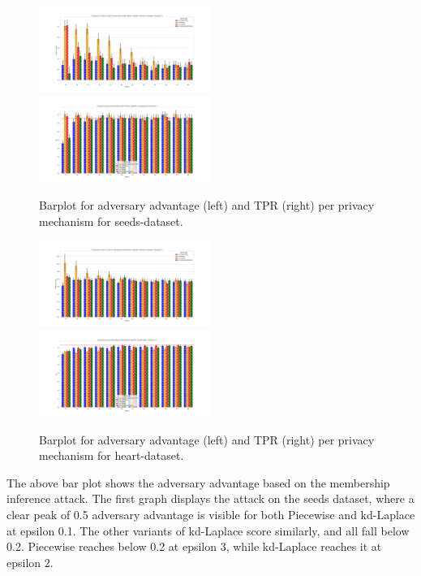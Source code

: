 \begin{figure}[H]
    \centering
    \begin{minipage}[c]{1.1\textwidth}
        \includegraphics[width=0.50\textwidth]{Results/RQ1/seeds-dataset/shokri_mi_adv_seeds-dataset_comparison.png}
        \includegraphics[width=0.50\textwidth]{Results/RQ1/seeds-dataset/tpr_seeds-dataset_comparison.png}
        \caption{Barplot for adversary advantage (left) and TPR (right) per privacy mechanism for seeds-dataset.}
        \label{fig:privacy_seeds-dataset_comparison_2d_aa_plot}
    \end{minipage}
    \begin{minipage}[c]{1.1\textwidth}
        \includegraphics[width=0.50\textwidth]{Results/RQ1/heart-dataset/shokri_mi_adv_heart-dataset_comparison.png}
        \includegraphics[width=0.50\textwidth]{Results/RQ1/heart-dataset/tpr_heart-dataset_comparison.png}
        \caption{Barplot for adversary advantage (left) and TPR (right) per privacy mechanism for heart-dataset.}
        \label{fig:privacy_heart-dataset_comparison_2d_add_plot}
    \end{minipage}
\end{figure}
The above bar plot shows the adversary advantage based on the membership inference attack. The first graph displays the attack on the seeds dataset, where a clear peak of 0.5 adversary advantage is visible for both Piecewise and kd-Laplace at epsilon 0.1. The other variants of kd-Laplace score similarly, and all fall below 0.2. Piecewise reaches below 0.2 at epsilon 3, while kd-Laplace reaches it at epsilon 2.

